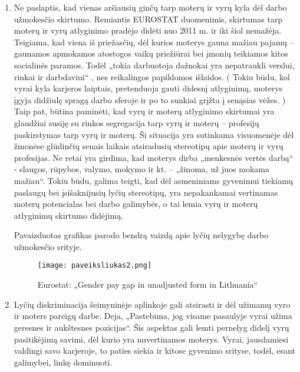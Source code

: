 \documentclass[titlepage, 11pt]{article}
\begin{document}
\begin{enumerate}
\item Ne paslaptis, kad vienas aršiausių ginčų tarp moterų ir vyrų kyla dėl darbo užmokesčio skirtumo. Remiantis EUROSTAT duomenimis, skirtumas tarp moterų ir vyrų atlyginimo pradėjo didėti nuo 2011 m. ir iki šiol nemažėja. Teigiama, kad viena iš priežasčių, dėl kurios moterys gauna mažiau pajamų – gaunamos apmokamos atostogos vaikų priežiūrai bei įmonių teikiamos kitos socialinės paramos. Todėl „tokia darbuotoja dažnokai yra nepatraukli verslui, rinkai ir darbdaviui“ \cite{Reinikovaite1998zmogus}, nes reikalingos papildomos išlaidos. ( Tokiu būdu, kol vyrai kyla karjeros laiptais, pretenduoja gauti didesnį atlyginimą, moterys įgyja didžiulę spragą darbo sferoje ir po to sunkiai grįžta į senąsias vėžes. ) Taip pat, būtina paminėti, kad vyrų ir moterų atlyginimo skirtumai yra glaudžiai susiję su rinkos segregacija tarp vyrų ir moterų – profesijų paskirstymas tarp vyrų ir moterų. Ši situacija yra sutinkama visuomenėje dėl žmonėse glūdinčių senais laikais atsiradusių stereotipų apie moterų ir vyrų profesijas. Ne retai yra girdima, kad moterys dirba „menkesnės vertės darbą“ - slaugos, rūpybos, valymo, mokymo ir kt. – „žinoma, už juos mokama mažiau“. Tokiu būdu, galima teigti, kad dėl asmeniniams gyvenimui tiekiamų paslaugų bei įsišaknijusių lyčių stereotipų, yra nepakankamai vertinamas moterų potencialas bei darbo galimybės, o tai lemia vyrų ir moterų atlyginimų skirtumo didėjimą.

Pavaizduotas grafikas parodo bendrą vaizdą apie lyčių nelygybę darbo užmokesčio srityje.

\begin{figure}[H]
\captionsetup{justification=centering}
\center
\texttt{[image: paveiksliukas2.png]}
\caption{Eurostat: „Gender pay gap in unadjusted form in Lithuania“}
\end{figure}

\item Lyčių diskriminacija šeimyninėje aplinkoje gali atsirasti ir dėl užimamų vyro ir moters pareigų darbe. Deja, „Pastebima, jog visame pasaulyje vyrai užima geresnes ir aukštesnes pozicijas“. Šis aspektas gali lemti pernelyg didelį vyrų pasitikėjimą savimi, dėl kurio yra nuvertinamos moterys. Vyrai, jausdamiesi valdingi savo karjeroje, to paties siekia ir kitose gyvenimo srityse, todėl, esant galimybei, linkę dominuoti. 


\end{enumerate}
\end{document}
